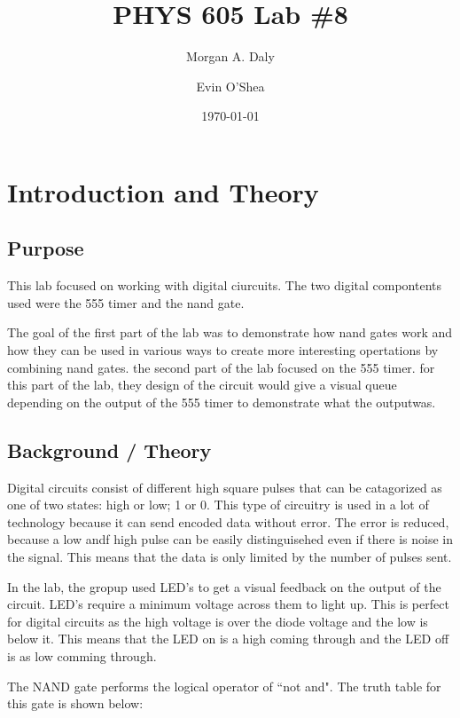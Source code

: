\documentclass[twocolumn, amsmath]{revtex4}
\begin{document}
\title{PHYS 605 Lab \#8} 

\author{Morgan A. Daly}
\author{Evin O'Shea}
\date{\today} 


\maketitle


\section{Introduction and Theory}
\subsection{Purpose}

This lab focused on working with digital ciurcuits. The two digital compontents used were the 555 timer and the nand gate. 

The goal of the first part of the lab was to demonstrate how nand gates work and how they can be used in various ways to create more interesting opertations by combining nand gates. 
the second part of the lab focused on the 555 timer. for this part of the lab, they design of the circuit would give a visual queue depending on the output of the 555 timer to demonstrate what the outputwas.



\subsection{Background / Theory}



Digital circuits consist of different high square pulses that can be catagorized as one of two states: high or low; 1 or 0. This type of circuitry is used in a lot of technology because it can send encoded data without error. The error is reduced, because a low andf high pulse can be easily distinguisehed even if there is noise in the signal. This means that the data is only limited by the number of pulses sent.

In the lab, the gropup used LED's to get a visual feedback on the output of the circuit. 
LED's require a minimum voltage across them to light up. This is perfect for digital circuits as the high voltage is over the diode voltage and the low is below it. This means that the LED on is a high coming through and the LED off is as low comming through.

The NAND gate performs the logical operator of ``not and". The truth table for this gate is shown below:
\end{document}
